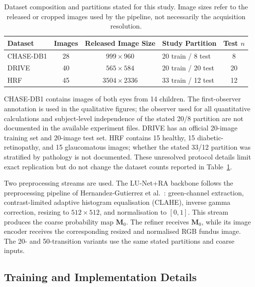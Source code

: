 \documentclass[jimaging,article,submit,pdftex,moreauthors]{Definitions/mdpi}%
\begin{document}
\begin{table}[htbp]
\centering
\caption{Dataset composition and partitions stated for this study. Image sizes refer to the released or cropped images used by the pipeline, not necessarily the acquisition resolution.}
\label{tab:datasets}
\small
\begin{tabularx}{\textwidth}{@{}l c c X c@{}}
\toprule
Dataset & Images & Released Image Size & Study Partition & Test $n$ \\
\midrule
CHASE-DB1 & 28 & $999\times960$ & 20 train / 8 test & 8 \\
DRIVE & 40 & $565\times584$ & 20 train / 20 test & 20 \\
HRF & 45 & $3504\times2336$ & 33 train / 12 test & 12 \\
\bottomrule
\end{tabularx}
\end{table}



CHASE-DB1 contains images of both eyes from 14 children. The first-observer annotation is used in the qualitative figures; the observer used for all quantitative calculations and subject-level independence of the stated 20/8 partition are not documented in the available experiment files. DRIVE has an official 20-image training set and 20-image test set. HRF contains 15 healthy, 15 diabetic-retinopathy, and 15 glaucomatous images; whether the stated 33/12 partition was stratified by pathology is not documented. These unresolved protocol details limit exact replication but do not change the dataset counts reported in Table~\ref{tab:datasets}.



Two preprocessing streams are used. The LU-Net+RA backbone follows the preprocessing pipeline of Hernandez-Gutierrez et al.~\cite{Hernandez2025}: green-channel extraction, contrast-limited adaptive histogram equalisation (CLAHE), inverse gamma correction, resizing to $512\times512$, and normalisation to $[0,1]$. This stream produces the coarse probability map $\mathbf{M}_0$. The refiner receives $\mathbf{M}_0$, while its image encoder receives the corresponding resized and normalised RGB fundus image. The 20- and 50-transition variants use the same stated partitions and coarse inputs.



\subsection{Training and Implementation Details}
\end{document}
